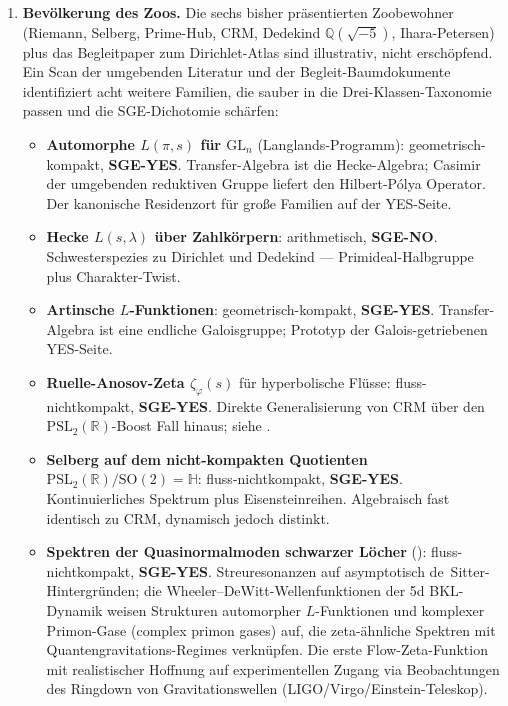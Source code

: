 \documentclass[11pt]{article}
\theoremstyle{definition}
\theoremstyle{remark}
\newcommand{\PSL}{\mathrm{PSL}}
\begin{document}
\begin{enumerate}
\item \textbf{Bevölkerung des Zoos.} Die sechs bisher präsentierten Zoobewohner
  (Riemann, Selberg, Prime-Hub, CRM, Dedekind
  $\mathbb{Q}(\sqrt{-5})$, Ihara-Petersen) plus das Begleitpaper zum Dirichlet-Atlas
  \cite{DirichletAtlas} sind illustrativ, nicht erschöpfend.
  Ein Scan der umgebenden Literatur und der Begleit-Baumdokumente
  \cite{CandidatesMasterList} identifiziert acht weitere
  Familien, die sauber in die Drei-Klassen-Taxonomie passen und die
  SGE-Dichotomie schärfen:
  \begin{itemize}
  \item \textbf{Automorphe $L(\pi, s)$ für $\mathrm{GL}_n$}
  (Langlands-Programm): geometrisch-kompakt, \textbf{SGE-YES}.
  Transfer-Algebra ist die Hecke-Algebra; Casimir der umgebenden
  reduktiven Gruppe liefert den Hilbert-P\'olya Operator. Der
  kanonische Residenzort für große Familien auf der YES-Seite.
  \item \textbf{Hecke $L(s, \lambda)$ über Zahlkörpern}:
  arithmetisch, \textbf{SGE-NO}. Schwesterspezies zu Dirichlet und
  Dedekind --- Primideal-Halbgruppe plus Charakter-Twist.
  \item \textbf{Artinsche $L$-Funktionen}: geometrisch-kompakt,
  \textbf{SGE-YES}. Transfer-Algebra ist eine endliche Galoisgruppe;
  Prototyp der Galois-getriebenen YES-Seite.
  \item \textbf{Ruelle-Anosov-Zeta $\zeta_\varphi(s)$} für hyperbolische
  Flüsse: fluss-nichtkompakt, \textbf{SGE-YES}. Direkte Generalisierung
  von CRM über den $\PSL_2(\mathbb{R})$-Boost Fall hinaus; siehe
  \cite{DyatlovZworski2019}.
  \item \textbf{Selberg auf dem nicht-kompakten Quotienten}
  $\mathrm{PSL}_2(\mathbb{R})/\mathrm{SO}(2) = \mathbb{H}$:
  fluss-nichtkompakt, \textbf{SGE-YES}. Kontinuierliches Spektrum plus
  Eisensteinreihen. Algebraisch fast identisch zu CRM,
  dynamisch jedoch distinkt.
  \item \textbf{Spektren der Quasinormalmoden schwarzer Löcher}
  (\cite{DeClerckHartnollYang2025}): fluss-nichtkompakt,
  \textbf{SGE-YES}. Streuresonanzen auf asymptotisch
  de~Sitter-Hintergründen; die Wheeler--DeWitt-Wellenfunktionen der 5d
  BKL-Dynamik weisen Strukturen automorpher $L$-Funktionen und
  komplexer Primon-Gase (complex primon gases) auf, die zeta-ähnliche Spektren mit Quantengravitations-Regimes verknüpfen.
  Die erste Flow-Zeta-Funktion mit realistischer Hoffnung auf experimentellen Zugang
  via Beobachtungen des Ringdown von Gravitationswellen (LIGO/Virgo/Einstein-Teleskop).

\end{itemize}
\end{enumerate}
\end{document}
